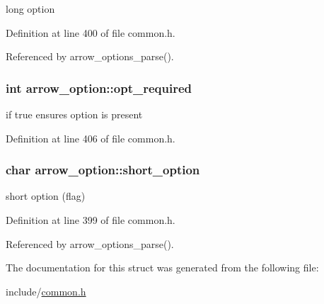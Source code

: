 long option 

Definition at line 400 of file common.h.

Referenced by arrow\_\-options\_\-parse().\hypertarget{structarrow__option_2e7290d4b7088eab30df5f3bfc34ce93}{
\subsubsection[{opt\_\-required}]{\setlength{\rightskip}{0pt plus 5cm}int {\bf arrow\_\-option::opt\_\-required}}}
\label{structarrow__option_2e7290d4b7088eab30df5f3bfc34ce93}


if true ensures option is present 

Definition at line 406 of file common.h.\hypertarget{structarrow__option_f47f3010fcddb84f4a67920db03d7233}{
\subsubsection[{short\_\-option}]{\setlength{\rightskip}{0pt plus 5cm}char {\bf arrow\_\-option::short\_\-option}}}
\label{structarrow__option_f47f3010fcddb84f4a67920db03d7233}


short option (flag) 

Definition at line 399 of file common.h.

Referenced by arrow\_\-options\_\-parse().

The documentation for this struct was generated from the following file:\begin{CompactItemize}
\item 
include/\hyperlink{common_8h}{common.h}\end{CompactItemize}
